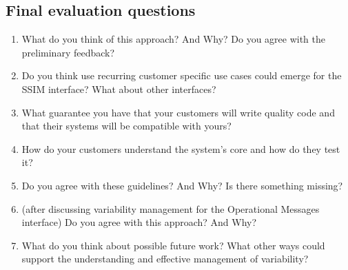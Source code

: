 \subsection*{Final evaluation questions} 
\begin{enumerate}
\item What do you think of this approach? And Why? Do you agree with the preliminary feedback? 

\item Do you think use recurring customer specific use cases could emerge for the SSIM interface? What about other interfaces? 

\item What guarantee you have that your customers will write quality code and that their systems will be compatible with yours? 

\item How do your customers understand the system's core and how do they test it?

\item Do you agree with these guidelines? And Why? Is there something missing? 

\item (after discussing variability management for the Operational Messages interface) Do you agree with this approach? And Why? 

\item What do you think about possible future work? What other ways could support the understanding and effective management of variability? 


  \end{enumerate}


